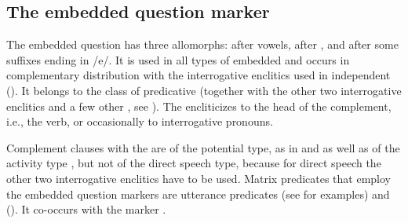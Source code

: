 
\subsection{The embedded question marker}
\label{ssec:The embedded question marker}

The embedded question  has three allomorphs:  after vowels,  after , and  after some suffixes ending in /e/. It is used in all types of embedded  and occurs in complementary distribution with the interrogative enclitics used in independent  (). It belongs to the class of predicative  (together with the other two interrogative enclitics and a few other , see ). The  encliticizes to the head of the complement, i.e., the verb, or occasionally to interrogative pronouns. 

Complement clauses with the  are of the potential type, as in  and  as well as of the activity type , but not of the direct speech type, because for direct speech the other two interrogative enclitics have to be used. Matrix predicates that employ the embedded question markers are utterance predicates (see  for examples) and  (). It co-occurs with the  marker .

